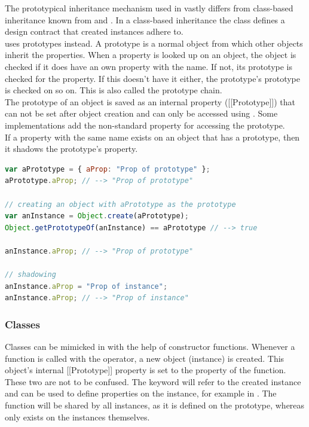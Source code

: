 The prototypical inheritance mechanism used in  vastly differs from class-based inheritance known from  and . In a class-based inheritance the class defines a design contract that created instances adhere to.\\
 uses prototypes instead. A prototype is a normal  object from which other objects inherit the properties. When a property is looked up on an object, the object is checked if it does have an own property with the name. If not, its prototype is checked for the property. If this doesn't have it either, the prototype's prototype is checked on so on. This is also called the prototype chain.\\
The prototype of an object is saved as an internal property ([[Prototype]]) that can not be set after object creation and can only be accessed using \linebreak{}. Some implementations add the non-standard \linebreak{} property for accessing the prototype.\\
If a property with the same name exists on an object that has a prototype, then it shadows the prototype's property.

\SingleSpacing
\begin{lstlisting}[language=JavaScript, caption=Prototypes]
var aPrototype = { aProp: "Prop of prototype" };
aPrototype.aProp; // --> "Prop of prototype"

// creating an object with aPrototype as the prototype
var anInstance = Object.create(aPrototype);
Object.getPrototypeOf(anInstance) == aPrototype // --> true

anInstance.aProp; // --> "Prop of prototype"

// shadowing
anInstance.aProp = "Prop of instance";
anInstance.aProp; // --> "Prop of instance"
\end{lstlisting}
\OnehalfSpacing

\subsubsection{Classes}
\label{sec:JSClasses}

Classes can be mimicked in  with the help of constructor functions. Whenever a function is called with the  operator, a new object (instance) is created. This object's internal [[Prototype]] property is set to the  property of the function. These two are not to be confused. The  keyword will refer to the created instance and can be used to define properties on the instance, for example  in . The  function will be shared by all instances, as it is defined on the prototype, whereas  only exists on the instances themselves.

